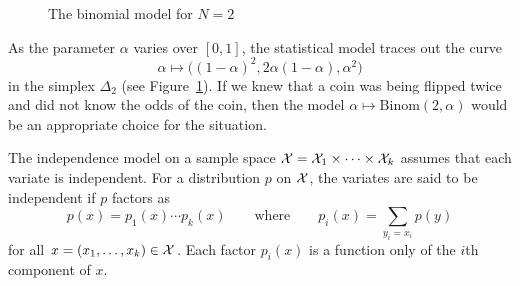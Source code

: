 \documentclass[cclicense]{hmcthesis}
\numberwithin{equation}{chapter}
\numberwithin{ucounter}{chapter}
\begin{document}
    \begin{figure}[H]
        \centering
        \vspace*{-0.2cm}
        \vspace*{-0.5cm}
        \caption{The binomial model for $N=2$}
        \label{fig:binomial}
    \end{figure}

    \noindent As the parameter $\alpha$ varies over $[0,1]$, the statistical
    model traces out the curve 
    \[
        \alpha \longmapsto \big((1-\alpha)^2, 2\alpha(1-\alpha), \alpha^2\big)
    \]
    in the simplex $\Delta_2$ (see Figure~\ref{fig:binomial}).  If we knew that
    a coin was being flipped twice and did not know the odds of the coin, then
    the model $\alpha \mapsto \mathrm{Binom}(2, \alpha)$ would be an appropriate
    choice for the situation.

    \begin{example}
        The independence model on a sample space $\mathcal{X} = \mathcal{X}_1 \times \cdots
        \times \mathcal{X}_k$ assumes that each variate is independent.  For a
        distribution $p$ on $\mathcal{X}$, the variates are said to be independent if
        $p$ factors as
        \[
            p(x) = p_1(x) \cdots p_k(x)
            \qquad
            \text{where}
            \qquad
            p_i(x) = \sum_{y_i = x_i} p(y) %
        \]
        for all $x = (x_1, \ldots, x_k) \in \mathcal{X}$.  Each factor $p_i(x)$ is a
        function only of the $i$th component of $x$.  
        \label{ex:independence1}
    \end{example}
        
\end{document}
